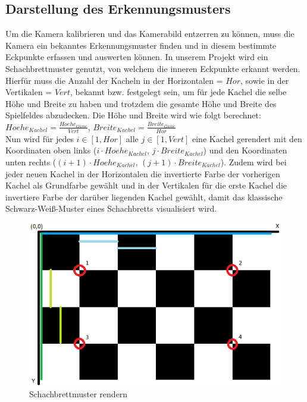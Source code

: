\subsection{Darstellung des Erkennungsmusters}
Um die Kamera kalibrieren und das Kamerabild entzerren zu können, muss die Kamera ein bekanntes Erkennungsmuster finden und in diesem bestimmte Eckpunkte erfassen und auswerten können. In unserem Projekt wird ein Schachbrettmuster genutzt, von welchem die inneren Eckpunkte erkannt werden. Hierfür muss die Anzahl der Kacheln in der Horizontalen = $Hor$, sowie in der Vertikalen = $Vert$, bekannt bzw. festgelegt sein, um für jede Kachel die selbe Höhe und Breite zu haben und trotzdem die gesamte Höhe und Breite des Spielfeldes abzudecken. Die Höhe und Breite wird wie folgt berechnet:\\
$Hoehe_{Kachel} = \frac{Hoehe_{Game}}{Vert}$, $Breite_{Kachel} = \frac{Breite_{Game}}{Hor}$\\
Nun wird für jedes $i \in [1,Hor]$ alle $j \in [1,Vert]$ eine Kachel gerendert mit den Koordinaten oben links ($i \cdot Hoehe_{Kachel}$, $j \cdot Breite_{Kachel}$) und den Koordinaten unten rechts ($(i+1) \cdot Hoehe_{Kachel}$, $(j+1) \cdot Breite_{Kachel}$). Zudem wird bei jeder neuen Kachel in der Horizontalen die invertierte Farbe der vorherigen Kachel als Grundfarbe gewählt und in der Vertikalen für die erste Kachel die invertiere Farbe der darüber liegenden Kachel gewählt, damit das klassische Schwarz-Weiß-Muster eines Schachbretts visualisiert wird.
\begin{figure}[h]
	\label{fig:chessboard}
	\centering
	\includegraphics[scale=0.8]{bilder/schachbrett.png}
	\caption{Schachbrettmuster rendern}
\end{figure}

